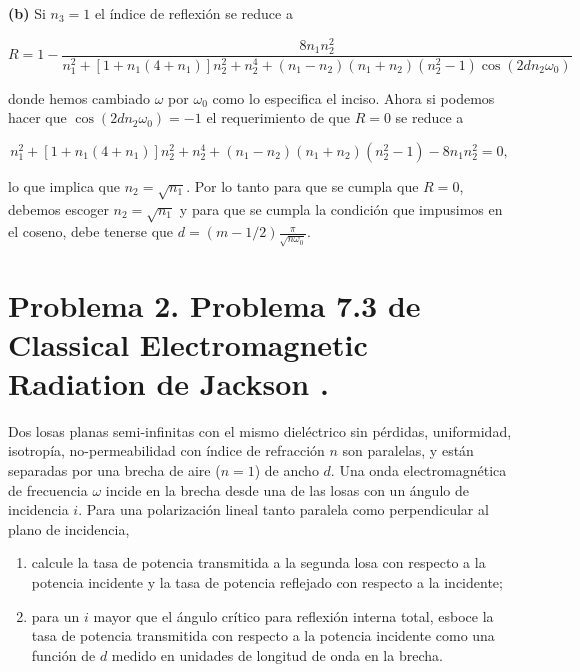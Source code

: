 \documentclass[a4paper,11pt]{article}
\numberwithin{equation}{section}
\begin{document}
\textbf{(b)} Si $n_3 = 1$ el índice de reflexión se reduce a 

\begin{equation}
 R = 1 - \frac{8n_1 n_2^2}{n_1^2 + [1 + n_1(4 + n_1)]n_2^2 + n_2^4 + 
 (n_1 - n_2)(n_1 + n_2)(n_2^2 - 1)\cos{(2 d n_2 \omega_0)}}
\end{equation}

donde hemos cambiado $\omega$ por $\omega_0$ como lo especifica el inciso. Ahora 
si podemos hacer que $\cos{(2 d n_2 \omega_0)} = -1$ el requerimiento de que $R = 0$ 
se reduce a 

\begin{equation}
 n_1^2 + [1 + n_1(4 + n_1)]n_2^2 + n_2^4 + 
 (n_1 - n_2)(n_1 + n_2)(n_2^2 - 1) - 8n_1 n_2^2 = 0,
\end{equation}

lo que implica que $n_2 = \sqrt{n_1}$. Por lo tanto para que se cumpla que $R=0$, debemos 
escoger $n_2 = \sqrt{n_1}$ y para que se cumpla la condición que impusimos en el 
coseno, debe tenerse que $d = (m - 1/2)\frac{\pi}{\sqrt{n\omega_0}}$.

\newpage

\section{Problema 2. Problema 7.3 de Classical Electromagnetic Radiation
de Jackson \cite{jackson}.}

Dos losas planas semi-infinitas con el mismo dieléctrico sin pérdidas, uniformidad,
isotropía, no-permeabilidad con índice de refracción $n$ son paralelas, y están 
separadas por una brecha de aire ($n = 1$) de ancho $d$. Una onda electromagnética 
de frecuencia $\omega$ incide en la brecha desde una de las losas con un ángulo 
de incidencia $i$. Para una polarización lineal tanto paralela como perpendicular 
al plano de incidencia,

\begin{enumerate}[label=\textbf{(\alph*)}]
 \item calcule la tasa de potencia transmitida a la segunda losa con respecto 
 a la potencia incidente y la tasa de potencia reflejado con respecto a la incidente;
 \item para un $i$ mayor que el ángulo crítico para reflexión interna total, 
 esboce la tasa de potencia transmitida con respecto a la potencia incidente 
 como una función de $d$ medido en unidades de longitud de onda en la brecha.
\end{enumerate}
\end{document}
